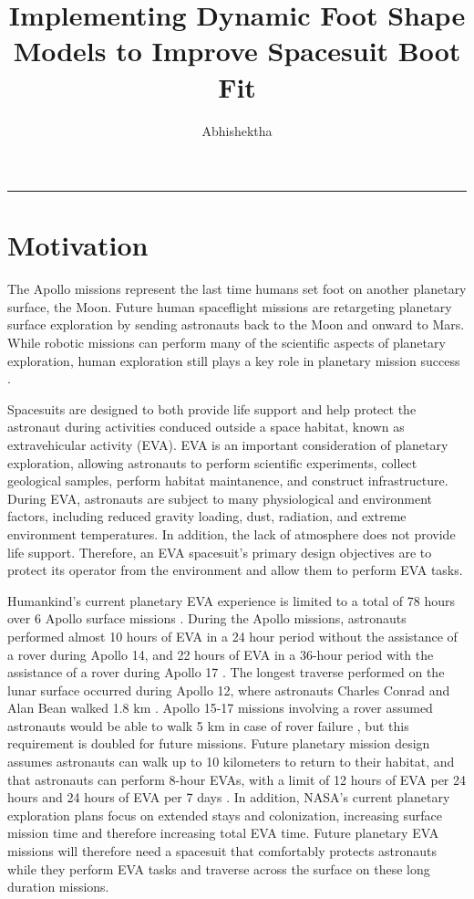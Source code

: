 \documentclass[defaultstyle,11pt]{comps}
\title{Implementing Dynamic Foot Shape Models to Improve Spacesuit Boot Fit}
\author{Abhishektha}{Boppana}
\begin{document}
\begin{center}\rule{0.5\linewidth}{0.5pt}\end{center}

\hypertarget{chapter:motiv}{%
\chapter{Motivation}\label{chapter:motiv}}

The Apollo missions represent the last time humans set foot on another planetary surface, the Moon.
Future human spaceflight missions are retargeting planetary surface exploration by sending astronauts back to the Moon and onward to Mars.
While robotic missions can perform many of the scientific aspects of planetary exploration, human exploration still plays a key role in planetary mission success \citep{Drake2010}.

Spacesuits are designed to both provide life support and help protect the astronaut during activities conduced outside a space habitat, known as extravehicular activity (EVA).
EVA is an important consideration of planetary exploration, allowing astronauts to perform scientific experiments, collect geological samples, perform habitat maintanence, and construct infrastructure.
During EVA, astronauts are subject to many physiological and environment factors, including reduced gravity loading, dust, radiation, and extreme environment temperatures.
In addition, the lack of atmosphere does not provide life support.
Therefore, an EVA spacesuit's primary design objectives are to protect its operator from the environment and allow them to perform EVA tasks.

Humankind's current planetary EVA experience is limited to a total of 78 hours over 6 Apollo surface missions \citep{Portree1997}.
During the Apollo missions, astronauts performed almost 10 hours of EVA in a 24 hour period without the assistance of a rover during Apollo 14, and 22 hours of EVA in a 36-hour period with the assistance of a rover during Apollo 17 \citep{Portree1997}.
The longest traverse performed on the lunar surface occurred during Apollo 12, where astronauts Charles Conrad and Alan Bean walked 1.8 km \citep{Portree1997}.
Apollo 15-17 missions involving a rover assumed astronauts would be able to walk 5 km in case of rover failure \citep{Portree1997}, but this requirement is doubled for future missions.
Future planetary mission design assumes astronauts can walk up to 10 kilometers to return
to their habitat, and that astronauts can perform 8-hour EVAs, with a limit of 12 hours of EVA per 24 hours and 24 hours of EVA per 7 days \citep{Drake2010}.
In addition, NASA's current planetary exploration plans focus on extended stays and colonization, increasing surface mission time and therefore increasing total EVA time.
Future planetary EVA missions will therefore need a spacesuit that comfortably protects astronauts while they perform EVA tasks and traverse across the surface on these long duration missions.
\end{document}
